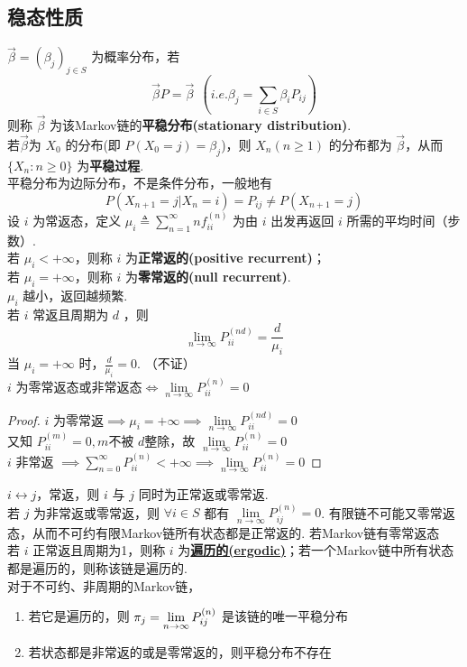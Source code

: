 \documentclass[./main.tex]{subfiles}
\begin{document}
\subsection{稳态性质}
$\vec{\beta}=(\beta_j)_{j\in S}$ 为概率分布，若
$$\vec{\beta}P=\vec{\beta}\ \ (i.e.\beta_j=\sum_{i\in S}\beta_iP_{ij})$$
则称 $\vec{\beta}$ 为该Markov链的\textbf{平稳分布(stationary distribution)}. \\
\indent 若$\vec{\beta}$为 $X_0$ 的分布(即 $P(X_0=j)=\beta_j$)，则 $X_n(n\ge 1)$ 的分布都为 $\vec{\beta}$，从而 $\{X_n:n\ge 0\}$ 为\textbf{平稳过程}. \\
\indent 平稳分布为边际分布，不是条件分布，一般地有 $$P(X_{n+1}=j|X_n=i)=P_{ij}\neq P(X_{n+1}=j)$$
设 $i$ 为常返态，定义 $\mu_{i}\triangleq \sum_{n=1}^{\infty}nf_{ii}^{(n)}$ 为由 $i$ 出发再返回 $i$ 所需的平均时间（步数）. \\
\indent 若 $\mu_i<+\infty$，则称 $i$ 为\textbf{正常返的(positive recurrent)}；\\
\indent 若 $\mu_i=+\infty$，则称 $i$ 为\textbf{零常返的(null recurrent)}. \\
\indent $\mu_i$ 越小，返回越频繁. 
\indent \\
若 $i$ 常返且周期为 $d$ ，则
\begin{equation}
    \lim\limits_{n\rightarrow\infty}P_{ii}^{(nd)}=\frac{d}{\mu_i}
\end{equation}
当 $\mu_i=+\infty$ 时，$\frac{d}{\mu_i}=0$. （不证）\\
$i$ 为零常返态或非常返态$\iff\lim\limits_{n\rightarrow \infty}P_{ii}^{(n)}=0$
\begin{proof}
    $i$ 为零常返$\implies\mu_i=+\infty\implies\lim\limits_{n\rightarrow\infty}P_{ii}^{(nd)}=0$\\
    又知 $P_{ii}^{(m)}=0,m$不被 $d$整除，故 $\lim\limits_{n\rightarrow \infty}P_{ii}^{(n)}=0$\\
    $i$ 非常返 $\implies\sum_{n=0}^{\infty}P_{ii}^{(n)}<+\infty\implies\lim\limits_{n\rightarrow\infty}P_{ii}^{(n)}=0$
\end{proof}
$i\leftrightarrow j$，常返，则 $i$ 与 $j$ 同时为正常返或零常返. \\
若 $j$ 为非常返或零常返，则 $\forall i\in S$ 都有 $\lim\limits_{n\rightarrow\infty}P_{ij}^{(n)}=0$. 有限链不可能又零常返态，从而不可约有限Markov链所有状态都是正常返的. 若Markov链有零常返态\\
若 $i$ 正常返且周期为1，则称 $i$ 为\underline{\textbf{遍历的(ergodic)}}；若一个Markov链中所有状态都是遍历的，则称该链是遍历的. \\
对于不可约、非周期的Markov链，
\begin{enumerate}[(1)]
    \item 若它是遍历的，则 $\pi_j=\lim\limits_{n\rightarrow\infty}P_{ij}^{(n)}$ 是该链的唯一平稳分布
    \item 若状态都是非常返的或是零常返的，则平稳分布不存在
\end{enumerate}
\end{document}

